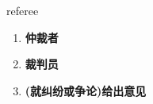 
\begin{frame}
{\huge referee}
\begin{center}
\begin{enumerate}\Large
  \item \textbf{仲裁者}
  \item \textbf{裁判员}
  \item \textbf{(就纠纷或争论)给出意见}
\end{enumerate}
\end{center}
\end{frame}

